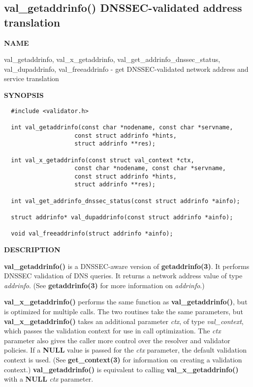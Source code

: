 \clearpage

\subsection{{\bf val\_getaddrinfo()} DNSSEC-validated address translation}


{\bf NAME}

val\_getaddrinfo, val\_x\_getaddrinfo, val\_get\_addrinfo\_dnssec\_status,
val\_dupaddrinfo, val\_freeaddrinfo - get DNSSEC-validated network address
and service translation

{\bf SYNOPSIS}

\begin{verbatim}
  #include <validator.h>

  int val_getaddrinfo(const char *nodename, const char *servname,
                    const struct addrinfo *hints,
                    struct addrinfo **res);

  int val_x_getaddrinfo(const struct val_context *ctx,
                    const char *nodename, const char *servname,
                    const struct addrinfo *hints,
                    struct addrinfo **res);

  int val_get_addrinfo_dnssec_status(const struct addrinfo *ainfo);

  struct addrinfo* val_dupaddrinfo(const struct addrinfo *ainfo);

  void val_freeaddrinfo(struct addrinfo *ainfo);
\end{verbatim}

{\bf DESCRIPTION}

{\bf val\_getaddrinfo()} is a DNSSEC-aware version of {\bf getaddrinfo(3)}.  It
performs DNSSEC validation of DNS queries.  It returns a network address value
of type {\it addrinfo}.  (See {\bf getaddrinfo(3)} for more information on
{\it addrinfo}.)

{\bf val\_x\_getaddrinfo()} performs the same function as {\bf
val\_getaddrinfo()}, but is optimized for multiple calls.  The two routines
take the same parameters, but {\bf val\_x\_getaddrinfo()} takes an additional
parameter {\it ctx}, of type {\it val\_context}, which passes the validation
context for use in call optimization.  The {\it ctx} parameter also gives the
caller more control over the resolver and validator policies.  If a {\bf NULL}
value is passed for the {\it ctx} parameter, the default validation context
is used.  (See {\bf get\_context(3)} for information on creating a validation
context.) {\bf val\_getaddrinfo()} is equivalent to calling {\bf
val\_x\_getaddrinfo()} with a {\bf NULL} {\it ctx} parameter.

